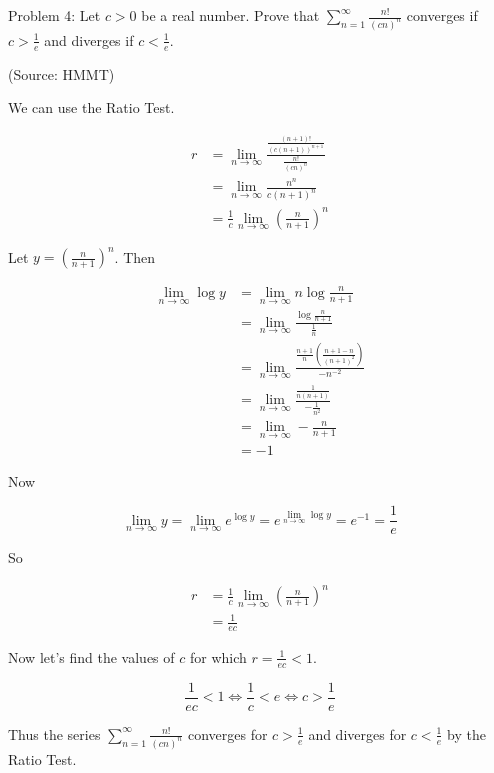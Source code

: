 Problem 4: Let $c > 0$ be a real number. Prove that $\displaystyle \sum_{n=1}^\infty \frac{n!}{(cn)^n}$ converges if $c > \frac{1}{e}$ and diverges if $c < \frac{1}{e}$.

(Source: HMMT)

We can use the Ratio Test.

\begin{align*}
r &= \lim_{n \rightarrow \infty} \frac{\frac{(n+1)!}{(c(n+1))^{n+1}}}{\frac{n!}{(cn)^{n}}} \\
&= \lim_{n \rightarrow \infty} \frac{n^n}{c(n+1)^{n}} \\
&= \frac{1}{c} \lim_{n \rightarrow \infty} \left(\frac{n}{n+1}\right)^n
\end{align*}

Let $y = \left(\frac{n}{n+1}\right)^n$. Then

\begin{align*}
\lim_{n \rightarrow \infty} \log y &= \lim_{n \rightarrow \infty} n \log{\frac{n}{n+1}} \\
&= \lim_{n \rightarrow \infty} \frac{\log{\frac{n}{n+1}}}{\frac{1}{n}} \\
&= \lim_{n \rightarrow \infty} \frac{\frac{n+1}{n} \left(\frac{n+1 - n}{(n+1)^2}\right)}{-n^{-2}} \\
&= \lim_{n \rightarrow \infty} \frac{\frac{1}{n(n+1)}}{-\frac{1}{n^2}} \\
&= \lim_{n \rightarrow \infty} - \frac{n}{n+1} \\
&= -1
\end{align*}

Now

$$ \lim_{n \rightarrow \infty} y = \lim_{n \rightarrow \infty} e^{\log y} = e^{\lim_{n \rightarrow \infty} \log y} = e^{-1} = \frac{1}{e} $$

So

\begin{align*}
r &= \frac{1}{c} \lim_{n \rightarrow \infty} \left(\frac{n}{n+1}\right)^n \\
&= \frac{1}{ec}
\end{align*}

Now let's find the values of $c$ for which $\displaystyle r = \frac{1}{ec} < 1$.

$$ \frac{1}{ec} < 1 \iff \frac{1}{c} < e \iff c > \frac{1}{e} $$

Thus the series $\displaystyle \sum_{n=1}^{\infty} \frac{n!}{(cn)^n}$ converges for $\displaystyle c > \frac{1}{e}$ and diverges for $\displaystyle c < \frac{1}{e}$ by the Ratio Test.
